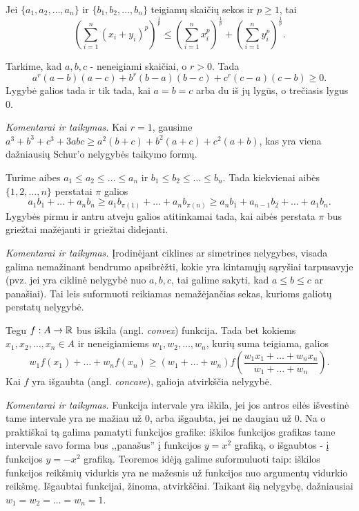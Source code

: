 \begin{thm}[Minkowski]
  Jei $\{a_1,a_2,\ldots,a_n\}$ ir $\{b_1,b_2,\ldots,b_n\}$ teigiamų skaičių
  sekos ir $p\geq 1$, tai
  $$\left(\sum_{i=1}^{n}{(x_i+y_i)^p}\right)^{\frac{1}{p}}\leq\left(\sum_{i=1}^{n}{x_i^p}\right)^{\frac{1}{p}}+\left(\sum_{i=1}^{n}{y_i^p}\right)^{\frac{1}{p}}.$$
\end{thm}

\begin{thm}[Schur]
  Tarkime, kad $a,b,c$ - neneigiami skaičiai, o $r>0$. Tada
  $$a^r(a-b)(a-c)+b^r(b-a)(b-c)+c^r(c-a)(c-b)\geq0.$$ Lygybė galios tada ir
  tik tada, kai $a=b=c$ arba du iš jų lygūs, o trečiasis lygus 0.
\end{thm}

\noindent \textit{Komentarai ir taikymas.} Kai $r=1$, gausime
$a^3+b^3+c^3+3abc\geq a^2(b+c)+b^2(a+c)+c^2(a+b)$, kas yra viena dažniausių
Schur'o nelygybės taikymo formų.

\begin{thm}
  Turime aibes $a_1\leq a_2\leq\ldots\leq a_n$ ir $b_1\leq b_2\leq\ldots\leq
  b_n$. Tada kiekvienai aibės $\{1,2,\ldots,n\}$ perstatai
  $\pi$ galios $$a_1b_1+\ldots+a_nb_n\geq
  a_1b_{\pi(1)}+\ldots+a_nb_{\pi(n)}\geq a_nb_1+a_{n-1}b_2+\ldots+a_1b_n.$$
  Lygybės pirmu ir antru atveju galios atitinkamai tada, kai aibės perstata
  $\pi$ bus griežtai mažėjanti ir griežtai didejanti.
\end{thm}

\noindent \textit{Komentarai ir taikymas.} Įrodinėjant ciklines ar
simetrines nelygybes, visada galima nemažinant bendrumo apsibrėžti, kokie
yra kintamųjų sąryšiai tarpusavyje (pvz. jei yra ciklinė nelygybė nuo
$a,b,c$, tai galime sakyti, kad $a\leq b\leq c$ ar panašiai). Tai leis
suformuoti reikiamas nemažėjančias sekas, kurioms galiotų perstatų
nelygybė.

\begin{thm}[Jensen]
  Tegu $f:A\rightarrow\mathbb R$ bus iškila (angl. \textit{convex}) funkcija. Tada
  bet kokiems $x_1,x_2,\ldots,x_n\in A$ ir neneigiamiems
  $w_1,w_2,\ldots,w_n$, kurių suma teigiama, galios
  $$w_1f(x_1)+\ldots+w_nf(x_n)\geq(w_1+\ldots+w_n)f\left(\frac{w_1x_1+\ldots+w_nx_n}{w_1+\ldots+w_n}\right).$$
  Kai $f$ yra išgaubta (angl. \textit{concave}), galioja atvirkščia
  nelygybė.
\end{thm}

\noindent \textit{Komentarai ir taikymas.} Funkcija intervale yra iškila,
jei jos antros eilės išvestinė tame intervale yra ne mažiau už $0$, arba
išgaubta, jei ne daugiau už $0$. Na o praktiškai tą galima pamatyti
funkcijos grafike: iškilos funkcijos grafikas tame intervale savo forma bus
,,panašus'' į funkcijos $y=x^2$ grafiką, o išgaubtos - į funkcijos $y=-x^2$
grafiką. Teoremos idėją galime suformuluoti taip: iškilos funkcijos
reikšmių vidurkis yra ne mažesnis už funkcijos nuo argumentų vidurkio
reikšmę.  Išgaubtai funkcijai, žinoma, atvirkščiai. Taikant šią nelygybę,
dažniausiai $w_1=w_2=\ldots=w_n=1$.

\newpage
